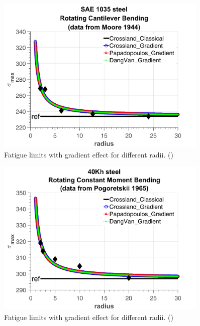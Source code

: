 \begin{figure}[!h]
	\begin{center}
		\includegraphics[width=0.9\textwidth]{figures//1035steel.png} 
		\caption{Fatigue limits with gradient effect for different radii. (\cite{Pogoretskii1966})}
		\label{fig.gradientcalibration3}
	\end{center}
\end{figure}

\begin{figure}[!h]
	\begin{center}
		\includegraphics[width=0.9\textwidth]{figures//40khsteel.png} 
		\caption{Fatigue limits with gradient effect for different radii. (\cite{Papadopoulos1996513})}
		\label{fig.gradientcalibration4}
	\end{center}
\end{figure}
\newpage

